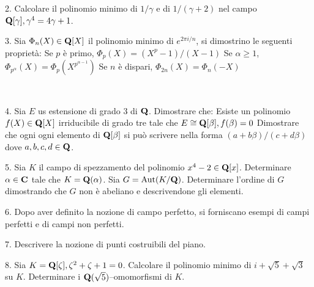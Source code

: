 
\item{2.} Calcolare il polinomio minimo di $1/\gamma$ e di $1/(\gamma+2)$ nel campo ${\bf Q}[\gamma],\gamma^4=4\gamma+1$.\vv


\item{3.} Sia $\Phi_n(X)\in{\bf Q}[X]$ il polinomio minimo di $e^{2\pi i/n}$, si dimostrino le seguenti propriet\`a:\smallskip
{} Se $p$ \`e primo, $\Phi_p(X)=(X^p-1)/(X-1)$\smallskip
{} Se $\alpha\ge1$, $\Phi_{p^\alpha}(X)=\Phi_p(X^{p^{\alpha-1}})$\smallskip
{} Se $n$ \`e dispari, $\Phi_{2n}(X)=\Phi_n(-X)$


\ve\ \vs


\item{4.} Sia $E$ us estensione di grado $3$ di ${\bf Q}$. Dimostrare che:\smallskip
{} Esiste un polinomio $f(X)\in{\bf Q}[X]$ irriducibile di grado tre tale che $E\cong{\bf Q}[\beta], f(\beta)=0$\smallskip
{} Dimostrare che ogni ogni elemento di ${\bf Q}[\beta]$ si pu\`o scrivere nella forma $(a+b\beta)/(c+d\beta)$ dove $a,b,c,d\in{\bf Q}$.

\vv

\item{5.} Sia $K$ il campo di spezzamento del polinomio $x^4-2\in{\bf Q}[x]$.\smallskip
{} Determinare $\alpha\in{\bf C}$ tale che $K={\bf Q}(\alpha)$. \smallskip
{} Sia $G={\rm Aut}(K/{\bf Q})$. Determinare l'ordine di $G$ dimostrando che $G$ non \`e abeliano e descrivendone gli elementi.
\ve\ \vs

\item{6.} Dopo aver definito la nozione di campo perfetto, si forniscano esempi di campi perfetti e di campi non perfetti.\vv\vv


\item{7.} Descrivere la nozione di punti costruibili del piano. 
\vv\vv


\item{8.} Sia $K={\bf Q}[\zeta],\zeta^2+\zeta+ 1 = 0$.\smallskip
{} Calcolare il polinomio minimo di $i+\sqrt5 +\sqrt3$ su $K$. \smallskip
{} Determinare i ${\bf Q}(\sqrt5)$--omomorfismi di $K$.

\vv

\ \vst
 \bye
